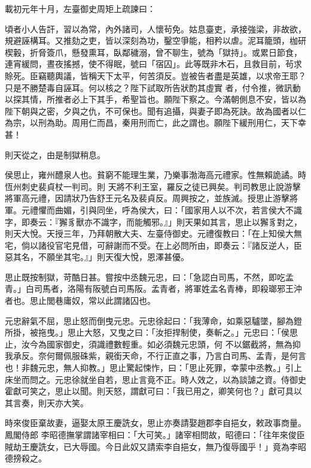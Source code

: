 \begin{pinyinscope}
 載初元年十月，左臺御史周矩上疏諫曰：



 頃者小人告訐，習以為常，內外諸司，人懷茍免。姑息臺吏，承接強梁，非故欲，規避誣構耳。又推劾之吏，皆以深刻為功，鑿空爭能，相矜以虐。泥耳籠頭，枷研楔轂，折脅簽爪，懸發熏耳，臥鄰穢溺，曾不聊生，號為「獄持」。或累日節食，連宵緩問，晝夜搖撼，使不得眠，號曰「宿囚」。此等既非木石，且救目前，茍求賒死。臣竊聽輿議，皆稱天下太平，何苦須反。豈被告者盡是英雄，以求帝王耶？只是不勝楚毒自誣耳。何以核之？陛下試取所告狀酌其虛實
 者，付令推，微訊動以探其情，所推者必上下其手，希聖旨也。願陛下察之。今滿朝側息不安，皆以為陛下朝與之密，夕與之仇，不可保也。聞有追攝，與妻子即為死訣。故為國者以仁為宗，以刑為助。周用仁而昌，秦用刑而亡，此之謂也。願陛下緩刑用仁，天下幸甚！



 則天從之，由是制獄稍息。



 侯思止，雍州醴泉人也。貧窮不能理生業，乃樂事渤海高元禮家。性無賴詭譎。時恆州刺史裴貞杖一判司。則
 天將不利王室，羅反之徒已興矣。判司教思止說游擊將軍高元禮，因請狀乃告舒王元名及裴貞反。周興按之，並族滅。授思止游擊將軍。元禮懼而曲媚，引與同坐，呼為侯大，曰：「國家用人以不次，若言侯大不識字，即奏云：『獬豸獸亦不識字，而能觸邪。』」則天果如其言，思止以獬豸對之，則天大悅。天授三年，乃拜朝散大夫、左臺侍御史。元禮復教曰：「在上知侯大無宅，倘以諸役官宅見借，可辭謝而不受。在上必問所由，即奏云：『諸反逆人，臣
 惡其名，不願坐其宅。』」則天復大悅，恩澤甚優。



 思止既按制獄，苛酷日甚。嘗按中丞魏元忠，曰：「急認白司馬，不然，即吃孟青。」白司馬者，洛陽有阪號白司馬阪。孟青者，將軍姓孟名青棒，即殺瑯邪王沖者也。思止閭巷庸奴，常以此謂諸囚也。



 元忠辭氣不屈，思止怒而倒曳元忠。元忠徐起曰：「我薄命，如乘惡驢墜，腳為鐙所掛，被拖曳。」思止大怒，又曳之曰：「汝拒捍制使，奏斬之。」元忠曰：「侯思止，汝今為國家御史，須識禮數輕重。如必須魏元忠頭，何
 不以鋸截將，無為抑我承反。奈何爾佩服硃紫，親銜天命，不行正直之事，乃言白司馬、孟青，是何言也！非魏元忠，無人抑教。」思止驚起悚怍，曰：「思止死罪，幸蒙中丞教。」引上床坐而問之。元忠徐就坐自若，思止言竟不正。時人效之，以為談謔之資。侍御史霍獻可笑之，思止以聞。則天怒，謂獻可曰：「我已用之，卿笑何也？」獻可具以其言奏，則天亦大笑。



 時來俊臣棄故妻，逼娶太原王慶詵女，思止亦奏請娶趙郡李自挹女，敕政事商量。鳳閣侍郎
 李昭德撫掌謂諸宰相曰：「大可笑。」諸宰相問故，昭德曰：「往年來俊臣賊劫王慶詵女，已大辱國。今日此奴又請索李自挹女，無乃復辱國乎！」竟為李昭德搒殺之。




\end{pinyinscope}
